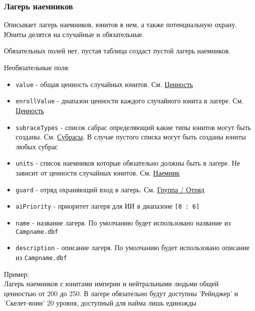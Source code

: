 \subsubsection{Лагерь наемников}
\label{mercenary}
Описывает лагерь наемников, юнитов в нем, а также потенциальную охрану. Юниты делятся на случайные и обязательные.

Обязательных полей нет, пустая таблица создаст пустой лагерь наемников.

Необязательные поля:
\begin{itemize}
\item \texttt{value} - общая ценность случайных юнитов. См. \hyperref[value]{Ценность}
\item \texttt{enrollValue} - диапазон ценности каждого случайного юнита в лагере. См. \hyperref[value]{Ценность}
\item \texttt{subraceTypes} - список сабрас определяющий какие типы юнитов могут быть созданы. См. \hyperref[subraceTypes]{Субрасы}. В случае пустого списка могут быть созданы юниты любых субрас
\item \texttt{units} - список наемников которые обязательно должны быть в лагере. Не зависит от ценности случайных юнитов. См. \hyperref[mercenaryUnit]{Наемник}
\item \texttt{guard} - отряд охраняющий вход в лагерь. См. \hyperref[group]{Группа / Отряд}
\item \texttt{aiPriority} - приоритет лагеря для ИИ в диапазоне \texttt{[0 : 6]}
\item \texttt{name} - название лагеря. По умолчанию будет использовано название из \texttt{Campname.dbf}
\item \texttt{description} - описание лагеря. По умолчанию будет использовано описание из \texttt{Campname.dbf}
\end{itemize}

Пример:\\
Лагерь наемников с юнитами империи и нейтральными людьми общей ценностью от 200 до 250.
В лагере обязательно будут доступны 'Рейнджер' и 'Скелет-воин' 20 уровня, доступный для найма лишь единожды

\begin{figure}[H]

\end{figure}